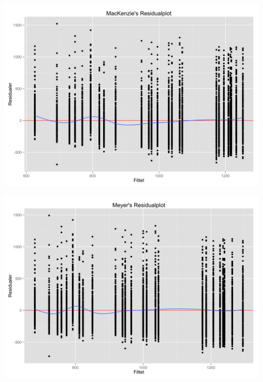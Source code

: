 \begin{minipage}{\linewidth}
\begin{minipage}{.5\linewidth}
		\label{fig:plot_residual_welford}
	\end{minipage}
	\begin{minipage}{.5\linewidth}
		\includegraphics[width=\linewidth]{images/plots/plot_residual_mackenzie}
		\label{fig:plot_residual_mackenzie}
	\end{minipage}
	\begin{minipage}{.5\linewidth}
		\includegraphics[width=\linewidth]{images/plots/plot_residual_meyer}
		\label{fig:plot_residual_meyer}
	\end{minipage}
\end{minipage}

